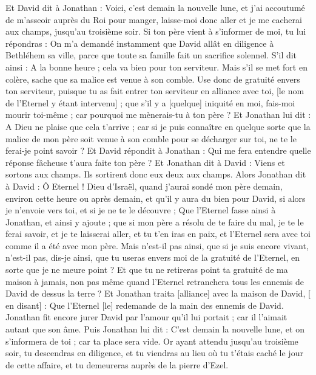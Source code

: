 \begin{multicols}{2}
Et David dit à Jonathan : Voici, c'est demain la nouvelle lune, et j'ai accoutumé de m'asseoir auprès du Roi pour manger, laisse-moi donc aller et je me cacherai aux champs, jusqu'au troisième soir.
Si ton père vient à s'informer de moi, tu lui répondras : On m'a demandé instamment que David allât en diligence à Bethléhem sa ville, parce que toute sa famille fait un sacrifice solennel.
S'il dit ainsi : A la bonne heure ; cela va bien pour ton serviteur. Mais s'il se met fort en colère, sache que sa malice est venue à son comble.
Use donc de gratuité envers ton serviteur, puisque tu as fait entrer ton serviteur en alliance avec toi, [le nom de l'Eternel y étant intervenu] ; que s'il y a [quelque] iniquité en moi, fais-moi mourir toi-même ; car pourquoi me mènerais-tu à ton père ?
Et Jonathan lui dit : A Dieu ne plaise que cela t'arrive ; car si je puis connaître en quelque sorte que la malice de mon père soit venue à son comble pour se décharger sur toi, ne te le ferai-je point savoir ?
Et David répondit à Jonathan : Qui me fera entendre quelle réponse fâcheuse t'aura faite ton père ?
Et Jonathan dit à David : Viens et sortons aux champs. Ils sortirent donc eux deux aux champs.
Alors Jonathan dit à David : Ô Eternel ! Dieu d'Israël, quand j'aurai sondé mon père demain, environ cette heure ou après demain, et qu'il y aura du bien pour David, si alors je n'envoie vers toi, et si je ne te le découvre ;
Que l'Eternel fasse ainsi à Jonathan, et ainsi y ajoute ; que si mon père a résolu de te faire du mal, je te le ferai savoir, et je te laisserai aller, et tu t'en iras en paix, et l'Eternel sera avec toi comme il a été avec mon père.
Mais n'est-il pas ainsi, que si je suis encore vivant, n'est-il pas, dis-je ainsi, que tu useras envers moi de la gratuité de l'Eternel, en sorte que je ne meure point ?
Et que tu ne retireras point ta gratuité de ma maison à jamais, non pas même quand l'Eternel retranchera tous les ennemis de David de dessus la terre ?
Et Jonathan traita [alliance] avec la maison de David, [ en disant] : Que l'Eternel [le] redemande de la main des ennemis de David.
Jonathan fit encore jurer David par l'amour qu'il lui portait ; car il l'aimait autant que son âme.
Puis Jonathan lui dit : C'est demain la nouvelle lune, et on s'informera de toi ; car ta place sera vide.
Or ayant attendu jusqu'au troisième soir, tu descendras en diligence, et tu viendras au lieu où tu t'étais caché le jour de cette affaire, et tu demeureras auprès de la pierre d'Ezel.

\end{multicols}
